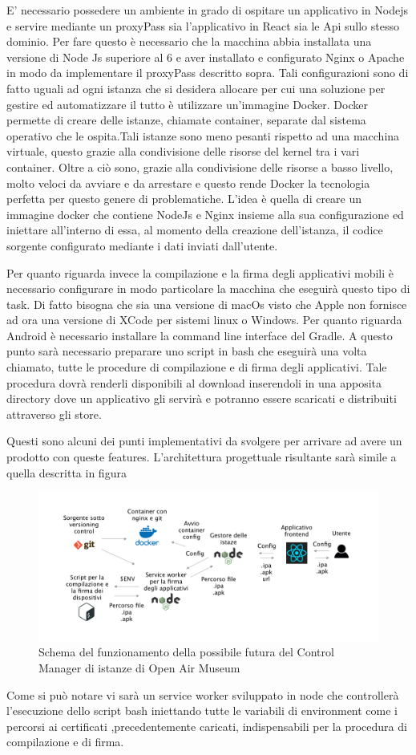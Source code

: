 E’ necessario possedere un ambiente in grado di ospitare un applicativo in Nodejs e servire mediante un proxyPass sia l’applicativo in React sia le Api sullo stesso dominio. Per fare questo è necessario che la macchina abbia installata una versione di Node Js superiore al 6 e aver installato e configurato Nginx o Apache in modo da implementare il proxyPass descritto sopra. Tali configurazioni sono di fatto uguali ad ogni istanza che si desidera allocare per cui una soluzione per gestire ed automatizzare il tutto è utilizzare un'immagine Docker. Docker permette di creare delle istanze, chiamate container, separate dal sistema operativo che le ospita.Tali istanze sono meno pesanti rispetto ad una macchina virtuale, questo grazie alla condivisione delle risorse del kernel tra i vari container. Oltre a ciò sono, grazie alla condivisione delle risorse a basso livello, molto veloci da avviare e da arrestare e questo rende Docker la tecnologia perfetta per questo genere di problematiche.
L’idea è quella di creare un immagine docker che contiene NodeJs e Nginx insieme alla sua configurazione ed iniettare all’interno di essa, al momento della creazione dell’istanza, il codice sorgente configurato mediante i dati inviati dall’utente.\vspace{5mm}

Per quanto riguarda invece la compilazione e la firma degli applicativi mobili è necessario configurare in modo particolare la macchina che eseguirà questo tipo di task. Di fatto bisogna che sia una versione di macOs visto che Apple non fornisce ad ora una versione di XCode per sistemi linux o Windows. Per quanto riguarda Android è necessario installare la command line interface del Gradle. A questo punto sarà necessario preparare uno script in bash che eseguirà una volta chiamato, tutte le procedure di compilazione e di firma degli applicativi. Tale procedura dovrà renderli disponibili al download inserendoli in una apposita directory dove un applicativo gli servirà e potranno essere scaricati e distribuiti attraverso gli store.\vspace{5mm}

Questi sono alcuni dei punti implementativi da svolgere per arrivare ad avere un prodotto con queste features. L’architettura progettuale risultante sarà simile a quella descritta in figura\vspace{5mm}

\begin{figure}[h]
\centering
\includegraphics[width=1\textwidth]{images/schemaIstanzeAlakai.png}
\caption{Schema del funzionamento della possibile futura del Control Manager di istanze di Open Air Museum}
\end{figure}

Come si può notare vi sarà un service worker sviluppato in node che controllerà l’esecuzione dello script bash iniettando tutte le variabili di environment come i percorsi ai certificati ,precedentemente caricati, indispensabili per la procedura di compilazione e di firma.\vspace{5mm}
